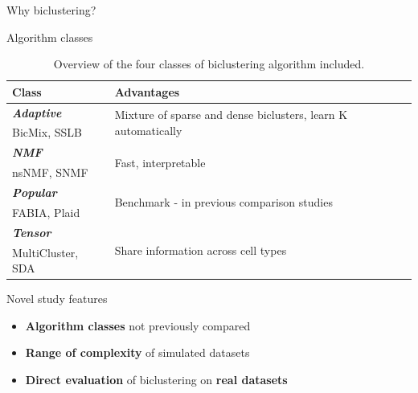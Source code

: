 \documentclass[xcolor=table,final]{beamer}
\newlength{\onecolwid}
\renewcommand{\bold}[1]{{\textcolor{norange}{\textbf{#1}}}}
\begin{document}
\begin{frame}[t]
\begin{columns}[t]
\begin{column}{\onecolwid}
\begin{block}{Why biclustering?}
\end{block}



\begin{block}{Algorithm classes}

\begin{table}[t!]
    \caption{Overview of the four classes of biclustering algorithm included.}

    \begin{tabular}{ l | l }
\textbf{Class} & \textbf{Advantages} \\ \hline
    \cellcolor[HTML]{C50F11}\color[HTML]{FFFFFF}\textbf{\textit{Adaptive}} & \multirow{2}{0.6 \textwidth}{Mixture of sparse and dense biclusters, learn K automatically} \\
    BicMix, SSLB & \\ \hline
    \cellcolor[HTML]{3B93DC}\color[HTML]{FFFFFF}\textbf{\textit{NMF}} & \multirow{2}{0.6 \textwidth}{Fast, interpretable} \\
    nsNMF, SNMF & \\ \hline
    \cellcolor[HTML]{50bd4c}\color[HTML]{FFFFFF}\textbf{\textit{Popular}} & \multirow{2}{0.6 \textwidth}{Benchmark - in previous comparison studies} \\
     FABIA, Plaid & \\ \hline
    \cellcolor[HTML]{7f1c8e}\color[HTML]{FFFFFF}\textbf{\textit{Tensor}} & \multirow{2}{0.6 \textwidth}{Share information across cell types} \\
    MultiCluster, SDA & \\ \hline
\end{tabular}
\end{table}

\end{block}




\begin{block}{Novel study features}

\begin{itemize}
    \item \bold{Algorithm classes} not previously compared
    \item \bold{Range of complexity} of simulated datasets
    \item \bold{Direct evaluation} of biclustering on \bold{real datasets}
\end{itemize}


\end{block}
\end{column}
\end{columns}
\end{frame}
\end{document}
